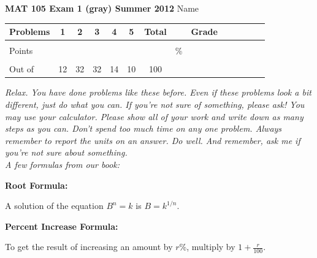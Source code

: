 \documentclass[12pt]{article}
\begin{document}
\textbf{MAT 105 Exam 1 (gray) Summer 2012} \hspace{.4in} {\large Name} \hrulefill

\begin{center}

\begin{tabular}
{|l|c|c|c|c|c|c|c|c|c|c|c|c|c|} \hline

 Problems & \hspace{5 pt} 1 \hspace{5 pt}  & \hspace{5 pt} 2 \hspace{5 pt} & \hspace{5 pt} 3 \hspace{5 pt} & \hspace{5 pt} 4 \hspace{5 pt} & \hspace{5 pt} 5 \hspace{5 pt} & \hspace{5 pt} Total  \hspace{5 pt} & &  \hspace{5 pt} Grade \hspace{5 pt}  \\ \hline
&&&&&&&&\\  
Points &&&&&&&    \hspace{.8in}\% &  \\ 
&&&&&&&& \\  \hline
Out of & 12 & 32 & 32 & 14 & 10 &100 & & \\ \hline

\end {tabular}

\end{center}

\vspace{.2in}

 \emph{Relax.  You have done problems like these before.  Even if these problems look a bit different, just do what you can.  If you're not sure of something, please ask! You may use your calculator.  Please show all of your work and write down as many steps as you can.  Don't spend too much time on any one problem.  Always remember to report the units on an answer. Do well.  And remember, ask me if you're not sure about something.}\\

\vspace{.5in} 
\noindent \emph{A few formulas from our book:}

\begin{center}

\textbf{Root Formula:} 

A solution of the equation $B^n=k$ is $B=k^{1/n}$.

\vspace{.2in} 

\textbf{Percent Increase Formula:} 

To get the result of increasing an amount by $r$\%, multiply by $1 + \frac{r}{100}$.

\end{center}
\end{document}

